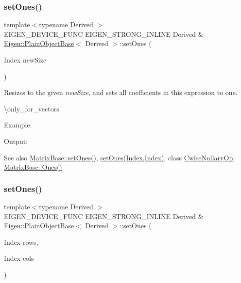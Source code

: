 \subsubsection{\texorpdfstring{setOnes()}{setOnes()}\hspace{0.1cm}{\footnotesize\ttfamily [1/2]}}
{\footnotesize\ttfamily template$<$typename Derived $>$ \\
E\+I\+G\+E\+N\+\_\+\+D\+E\+V\+I\+C\+E\+\_\+\+F\+U\+NC E\+I\+G\+E\+N\+\_\+\+S\+T\+R\+O\+N\+G\+\_\+\+I\+N\+L\+I\+NE Derived \& \mbox{\hyperlink{class_eigen_1_1_plain_object_base}{Eigen\+::\+Plain\+Object\+Base}}$<$ Derived $>$\+::set\+Ones (\begin{DoxyParamCaption}\item[{Index}]{new\+Size }\end{DoxyParamCaption})}

Resizes to the given {\itshape new\+Size}, and sets all coefficients in this expression to one.

\textbackslash{}only\+\_\+for\+\_\+vectors

Example\+: 
\begin{DoxyCodeInclude}{0}
\end{DoxyCodeInclude}
 Output\+: 
\begin{DoxyVerbInclude}
\end{DoxyVerbInclude}


\begin{DoxySeeAlso}{See also}
\mbox{\hyperlink{class_eigen_1_1_dense_base_ad18970fd7d9f9c3d8db9d05fa8652a25}{Matrix\+Base\+::set\+Ones()}}, \mbox{\hyperlink{class_eigen_1_1_plain_object_base_a8e3043e7a51c524c1d1793a3e9826819}{set\+Ones(\+Index,\+Index)}}, class \mbox{\hyperlink{class_eigen_1_1_cwise_nullary_op}{Cwise\+Nullary\+Op}}, \mbox{\hyperlink{class_eigen_1_1_dense_base_a1284a38971d817c33e40c226f6347e37}{Matrix\+Base\+::\+Ones()}} 
\end{DoxySeeAlso}
\mbox{\label{class_eigen_1_1_plain_object_base_a8e3043e7a51c524c1d1793a3e9826819}} 
\subsubsection{\texorpdfstring{setOnes()}{setOnes()}\hspace{0.1cm}{\footnotesize\ttfamily [2/2]}}
{\footnotesize\ttfamily template$<$typename Derived $>$ \\
E\+I\+G\+E\+N\+\_\+\+D\+E\+V\+I\+C\+E\+\_\+\+F\+U\+NC E\+I\+G\+E\+N\+\_\+\+S\+T\+R\+O\+N\+G\+\_\+\+I\+N\+L\+I\+NE Derived \& \mbox{\hyperlink{class_eigen_1_1_plain_object_base}{Eigen\+::\+Plain\+Object\+Base}}$<$ Derived $>$\+::set\+Ones (\begin{DoxyParamCaption}\item[{Index}]{rows,  }\item[{Index}]{cols }\end{DoxyParamCaption})}


